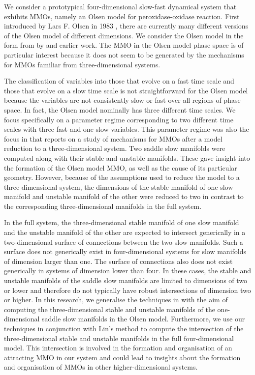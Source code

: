 \documentclass{ws-ijbc}
\begin{document}
We consider a prototypical four-dimensional slow-fast dynamical system that exhibits MMOs, namely an Olsen model for peroxidase-oxidase reaction.  First introduced by Lars F. Olsen in 1983  \cite{Olsen}, there are currently many different versions of the Olsen model of different dimensions.  We consider the Olsen model in the form from by \cite{Rescaling} and earlier work.  The MMO in the Olsen model phase space is of particular interest because it does not seem to be generated by the mechanisms for MMOs familiar from three-dimensional systems.

The classification of variables into those that evolve on a fast time scale and those that evolve on a slow time scale is not straightforward for the Olsen model because the variables are not consistently slow or fast over all regions of phase space.  In fact, the Olsen model nominally has three different time scales.  We focus specifically on a parameter regime corresponding to two different time scales with three fast and one slow variables.  This parameter regime was also the focus in \cite{QSSA} that reports on a study of mechanisms for MMOs after a model reduction to a three-dimensional system.  Two saddle slow manifolds were computed along with their stable and unstable manifolds.  These gave insight into the formation of the Olsen model MMO, as well as the cause of its particular geometry.  However, because of the assumptions used to reduce the model to a three-dimensional system, the dimensions of the stable manifold of one slow manifold and unstable manifold of the other were reduced to two in contrast to the corresponding three-dimensional manifolds in the full system.  

In the full system, the three-dimensional stable manifold of one slow manifold and the unstable manifold of the other are expected to intersect generically in a two-dimensional surface of connections between the two slow manifolds.  Such a surface does not generically exist in four-dimensional systems for slow manifolds of dimension larger than one.  The surface of connections also does not exist generically in systems of dimension lower than four.  In these cases, the stable and unstable manifolds of the saddle slow manifolds are limited to dimensions of two or lower and therefore do not typically have robust intersections of dimension two or higher.  In this research, we generalise the techniques in \cite{Saeed_Paper} with the aim of computing the three-dimensional stable and unstable manifolds of the one-dimensional saddle slow manifolds in the Olsen model.  Furthermore, we use our techniques in conjunction with Lin's method to compute the intersection of the three-dimensional stable and unstable manifolds in the full four-dimensional model.  This intersection is involved in the formation and organisation of an attracting MMO in our system and could lead to insights about the formation and organisation of MMOs in other higher-dimensional systems.
\end{document}
